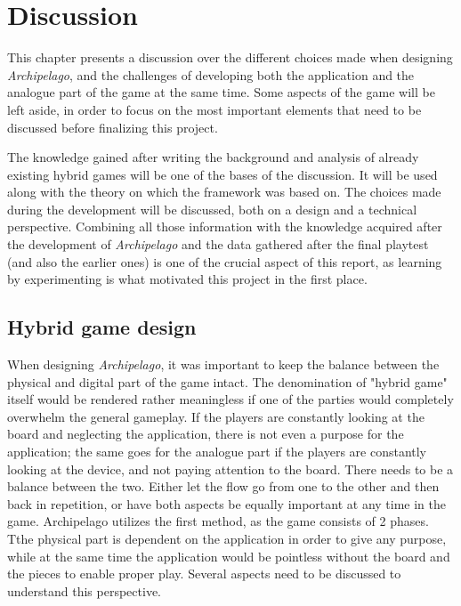 \chapter{Discussion}
\label{sec:disc}
This chapter presents a discussion over the different choices made when designing \textit{Archipelago}, and the challenges of developing both the application and the analogue part of the game at the same time. Some aspects of the game will be left aside, in order to focus on the most important elements that need to be discussed before finalizing this project.

The knowledge gained after writing the background and analysis of already existing hybrid games will be one of the bases of the discussion. It will be used along with the theory on which the framework was based on. The choices made during the development will be discussed, both on a design and a technical perspective. Combining all those information with the knowledge acquired after the development of \textit{Archipelago} and the data gathered after the final playtest (and also the earlier ones) is one of the crucial aspect of this report, as learning by experimenting is what motivated this project in the first place. 

\section{Hybrid game design}
When designing \textit{Archipelago}, it was important to keep the balance between the physical and digital part of the game intact. The denomination of "hybrid game" itself would be rendered rather meaningless if one of the parties would completely overwhelm the general gameplay. If the players are constantly looking at the board and neglecting the application, there is not even a purpose for the application; the same goes for the analogue part if the players are constantly looking at the device, and not paying attention to the board. There needs to be a balance between the two. Either let the flow go from one to the other and then back in repetition, or have both aspects be equally important at any time in the game. 
Archipelago utilizes the first method, as the game consists of 2 phases. Tthe physical part is dependent on the application in order to give any purpose, while at the same time the application would be pointless without the board and the pieces to enable proper play. Several aspects need to be discussed to understand this perspective.

